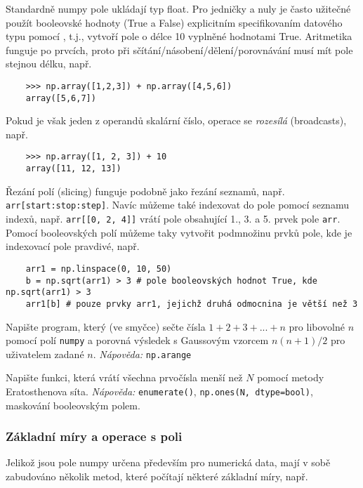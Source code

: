 Standardně numpy pole ukládají typ float. Pro jedničky a nuly je často užitečné použít booleovské hodnoty (True a False) explicitním specifikovaním datového typu pomocí , t.j.,  vytvoří pole o délce 10 vyplněné hodnotami True. Aritmetika funguje po prvcích, proto při sčítání/násobení/dělení/porovnávání musí mít pole stejnou délku, např.
\begin{lstlisting}
    >>> np.array([1,2,3]) + np.array([4,5,6])
    array([5,6,7])
\end{lstlisting}
Pokud je však jeden z operandů skalární číslo, operace se \emph{rozesílá} (broadcasts), např.
\begin{lstlisting}
    >>> np.array([1, 2, 3]) + 10
    array([11, 12, 13])
\end{lstlisting}

Řezání polí (slicing) funguje podobně jako řezání seznamů, např. \lstinline{arr[start:stop:step]}. Navíc můžeme také indexovat do pole pomocí seznamu indexů, např. \lstinline{arr[[0, 2, 4]]} vrátí pole obsahující 1., 3. a 5. prvek pole \lstinline{arr}. Pomocí booleovských polí můžeme taky vytvořit podmnožinu prvků pole, kde je indexovací pole pravdivé, např.
\begin{lstlisting}
    arr1 = np.linspace(0, 10, 50)
    b = np.sqrt(arr1) > 3 # pole booleovských hodnot True, kde np.sqrt(arr1) > 3
    arr1[b] # pouze prvky arr1, jejichž druhá odmocnina je větší než 3
\end{lstlisting}

\begin{exercise}
    Napište program, který (ve smyčce) sečte čísla $1 + 2 + 3 + ... + n$ pro libovolné $n$ pomocí polí \verb|numpy| a porovná výsledek s Gaussovým vzorcem $n(n+1)/2$ pro uživatelem zadané $n$. \emph{Nápověda:} \verb|np.arange|
\end{exercise}
\begin{exercise}
    Napište funkci, která vrátí všechna prvočísla menší než $N$ pomocí metody Eratosthenova síta. \emph{Nápověda:} \verb|enumerate()|, \verb|np.ones(N, dtype=bool)|, maskování booleovským polem.
\end{exercise}

\subsubsection{Základní míry a operace s poli}
Jelikož jsou pole numpy určena především pro numerická data, mají v sobě zabudováno několik metod, které počítají některé základní míry, např.

